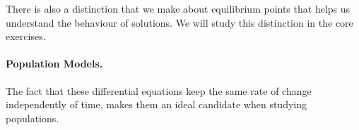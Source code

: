There is also a distinction that we make about equilibrium points that helps us understand the behaviour of solutions. We will study this distinction in the core exercises.







\paragraph{\color{cyan}Population Models.} The fact that these differential equations keep the same rate of change independently of time, makes them an ideal candidate when studying populations.

%
%
%
%
%
%
%
%
%
%
%
%
%
%
%
